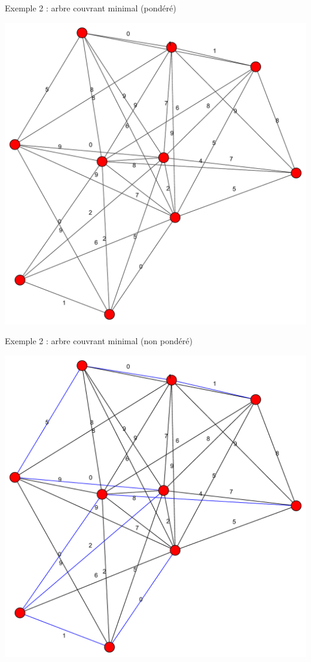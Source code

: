 \begin{frame}{Exemple 2 : arbre couvrant minimal (pondéré)}
    \begin{center}
        \includegraphics[height=.8\textheight]{fig/mstp-0.pdf}
    \end{center}
\end{frame}
\begin{frame}{Exemple 2 : arbre couvrant minimal (non pondéré)}
    \begin{center}
        \includegraphics[height=.8\textheight]{fig/mstp-1.pdf}
    \end{center}
\end{frame}

